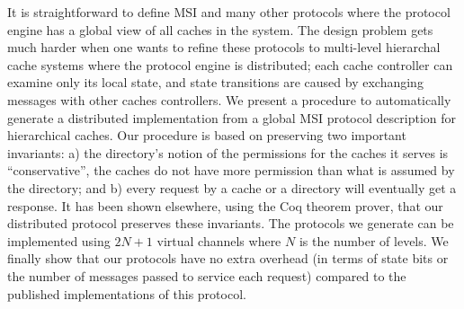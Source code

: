 


It is straightforward to define MSI and many other protocols where the protocol
engine has a global view of all caches in the system.  The design problem gets
much harder when one wants to refine these protocols to multi-level hierarchal
cache systems where the protocol engine is distributed; each cache controller
can examine only its local state, and state transitions are caused by
exchanging messages with other caches controllers. We present a procedure to
automatically generate a distributed implementation from a global MSI protocol
description for hierarchical caches. Our procedure is based on preserving two
important invariants: a) the directory's notion of the permissions for the
caches it serves is ``conservative'', \ie the caches do not have more
permission than what is assumed by the directory; and b) every request by a
cache or a directory will eventually get a response. It has been shown
elsewhere, using the Coq theorem prover, that our distributed protocol
preserves these invariants.  The protocols we generate can be implemented using
$2N + 1$ virtual channels where $N$ is the number of levels. We finally show
that our protocols have no extra overhead (in terms of state bits or the number
of messages passed to service each request) compared to the published
implementations of this protocol. 
 


